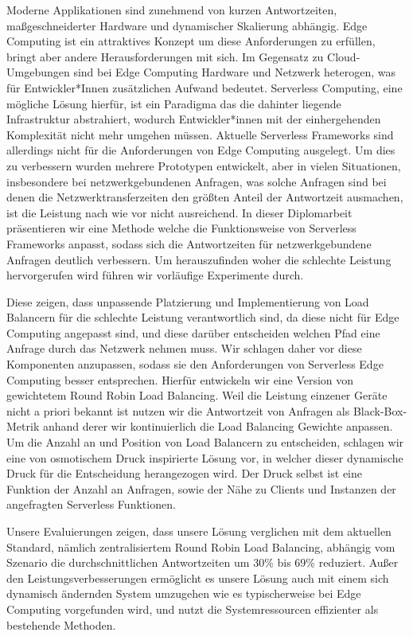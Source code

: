 Moderne Applikationen sind zunehmend von kurzen Antwortzeiten, maßgeschneiderter Hardware und dynamischer Skalierung abhängig.
Edge Computing ist ein attraktives Konzept um diese Anforderungen zu erfüllen, bringt aber andere Herausforderungen mit sich.
Im Gegensatz zu Cloud-Umgebungen sind bei Edge Computing Hardware und Netzwerk heterogen, was für Entwickler*Innen zusätzlichen Aufwand bedeutet.
Serverless Computing, eine mögliche Lösung hierfür, ist ein Paradigma das die dahinter liegende Infrastruktur abstrahiert, wodurch Entwickler*innen mit der einhergehenden Komplexität nicht mehr umgehen müssen.
Aktuelle Serverless Frameworks sind allerdings nicht für die Anforderungen von Edge Computing ausgelegt.
Um dies zu verbessern wurden mehrere Prototypen entwickelt, aber in vielen Situationen, insbesondere bei netzwerkgebundenen Anfragen, was solche Anfragen sind bei denen die Netzwerktransferzeiten den größten Anteil der Antwortzeit ausmachen, ist die Leistung nach wie vor nicht ausreichend.
In dieser Diplomarbeit präsentieren wir eine Methode welche die Funktionsweise von Serverless Frameworks  anpasst, sodass sich die Antwortzeiten für netzwerkgebundene Anfragen deutlich verbessern.
Um herauszufinden woher die schlechte Leistung hervorgerufen wird führen wir vorläufige Experimente durch.

Diese zeigen, dass unpassende Platzierung und Implementierung von Load Balancern für die schlechte Leistung verantwortlich sind, da diese nicht für Edge Computing angepasst sind, und diese darüber entscheiden welchen Pfad eine Anfrage durch das Netzwerk nehmen muss.
Wir schlagen daher vor diese Komponenten anzupassen, sodass sie den Anforderungen von Serverless Edge Computing besser entsprechen.
Hierfür entwickeln wir eine Version von gewichtetem Round Robin Load Balancing.
Weil die Leistung einzener Geräte nicht a priori bekannt ist nutzen wir die Antwortzeit von Anfragen als Black-Box-Metrik anhand derer wir kontinuierlich die Load Balancing Gewichte anpassen.
Um die Anzahl an und Position von Load Balancern zu entscheiden, schlagen wir eine von osmotischem Druck inspirierte Lösung vor, in welcher dieser dynamische Druck für die Entscheidung herangezogen wird.
Der Druck selbst ist eine Funktion der Anzahl an Anfragen, sowie der Nähe zu Clients und Instanzen der angefragten Serverless Funktionen.

Unsere Evaluierungen zeigen, dass unsere Lösung verglichen mit dem aktuellen Standard, nämlich zentralisiertem Round Robin Load Balancing, abhängig vom Szenario die durchschnittlichen Antwortzeiten um 30\% bis 69\% reduziert.
Außer den Leistungsverbesserungen ermöglicht es unsere Lösung auch mit einem sich dynamisch ändernden System umzugehen wie es typischerweise bei Edge Computing vorgefunden wird, und nutzt die Systemressourcen effizienter als bestehende Methoden.